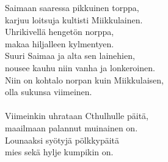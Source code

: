             Saimaan saaressa pikkuinen torppa, \\
            karjuu loitsuja kultisti Miikkulainen. \\
            Uhrikivellä hengetön norppa, \\
            makaa hiljalleen kylmentyen. \\
            Suuri Saimaa ja alta sen lainehien, \\
            nousee kauhu niin vanha ja lonkeroinen. \\
            Niin on kohtalo norpan kuin Miikkulaisen, \\
            olla sukunsa viimeinen. \\
\hspace{10mm} \\
            Viimeinkin uhrataan Cthulhulle päitä, \\
            maailmaan palannut muinainen on. \\
            Lounaaksi syötyjä pölkkypäitä \\
            mies sekä hylje kumpikin on. \\
